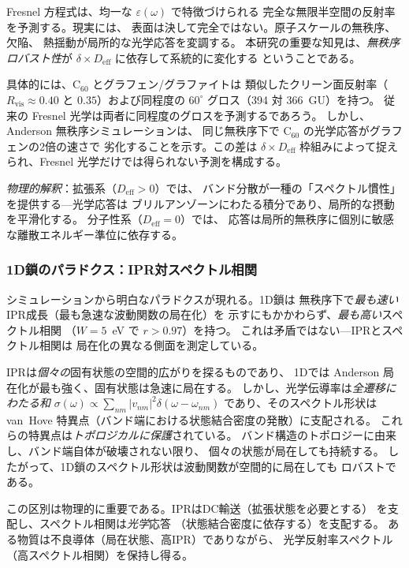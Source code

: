 \documentclass[twocolumn,showpacs,preprintnumbers,amsmath,amssymb,prb]{revtex4-2}
\begin{document}
Fresnel 方程式は、均一な $\varepsilon(\omega)$ で特徴づけられる
完全な無限半空間の反射率を予測する。現実には、
表面は決して完全ではない。原子スケールの無秩序、欠陥、
熱揺動が局所的な光学応答を変調する。
本研究の重要な知見は、\emph{無秩序ロバスト性}が
$\delta \times D_\mathrm{eff}$ に依存して系統的に変化する
ということである。

具体的には、C$_{60}$ とグラフェン/グラファイトは
類似したクリーン面反射率（$R_\mathrm{vis} \approx 0.40$ と
$0.35$）および同程度の $60^\circ$ グロス（394 対 366~GU）を持つ。
従来の Fresnel 光学は両者に同程度のグロスを予測するであろう。
しかし、Anderson 無秩序シミュレーションは、
同じ無秩序下で C$_{60}$ の光学応答がグラフェンの2倍の速さで
劣化することを示す。この差は $\delta \times D_\mathrm{eff}$
枠組みによって捉えられ、Fresnel 光学だけでは得られない予測を構成する。

\emph{物理的解釈}：拡張系（$D_\mathrm{eff} > 0$）では、
バンド分散が一種の「スペクトル慣性」を提供する---光学応答は
ブリルアンゾーンにわたる積分であり、局所的な摂動を平滑化する。
分子性系（$D_\mathrm{eff} = 0$）では、
応答は局所的無秩序に個別に敏感な離散エネルギー準位に依存する。

\subsubsection{1D鎖のパラドクス：IPR対スペクトル相関}

シミュレーションから明白なパラドクスが現れる。1D鎖は
無秩序下で\emph{最も速い} IPR成長（最も急速な波動関数の局在化）を
示すにもかかわらず、\emph{最も高い}スペクトル相関
（$W = 5$~eV で $r > 0.97$）を持つ。
これは矛盾ではない---IPRとスペクトル相関は
局在化の異なる側面を測定している。

IPRは\emph{個々の}固有状態の空間的広がりを探るものであり、
1Dでは Anderson 局在化が最も強く、固有状態は急速に局在する。
しかし、光学伝導率は\emph{全遷移にわたる和}
$\sigma(\omega) \propto \sum_{nm} |v_{nm}|^2
\delta(\omega - \omega_{nm})$ であり、そのスペクトル形状は
van~Hove 特異点（バンド端における状態結合密度の発散）に支配される。
これらの特異点は\emph{トポロジカルに保護}されている。
バンド構造のトポロジーに由来し、バンド端自体が破壊されない限り、
個々の状態が局在しても持続する。
したがって、1D鎖のスペクトル形状は波動関数が空間的に局在しても
ロバストである。

この区別は物理的に重要である。IPRはDC輸送（拡張状態を必要とする）
を支配し、スペクトル相関は\emph{光学}応答
（状態結合密度に依存する）を支配する。
ある物質は不良導体（局在状態、高IPR）でありながら、
光学反射率スペクトル（高スペクトル相関）を保持し得る。
\end{document}
